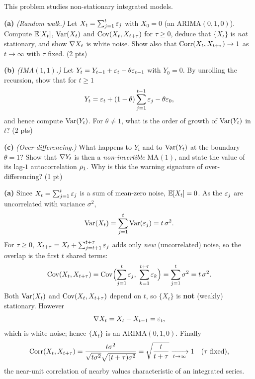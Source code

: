 \documentclass[11pt]{article}
\begin{document}
\statementstart
This problem studies non-stationary integrated models.

\textbf{(a)} \emph{(Random walk.)} Let $X_t=\sum_{j=1}^{t}\varepsilon_j$ with $X_0=0$ (an $\mathrm{ARIMA}(0,1,0)$). Compute $\mathbb{E}[X_t]$, $\operatorname{Var}(X_t)$ and $\operatorname{Cov}(X_t,X_{t+\tau})$ for $\tau\ge0$, deduce that $\{X_t\}$ is \emph{not} stationary, and show $\nabla X_t$ is white noise. Show also that $\operatorname{Corr}(X_t,X_{t+\tau})\to1$ as $t\to\infty$ with $\tau$ fixed. \hfill(2 pts)

\textbf{(b)} \emph{(IMA$(1,1)$.)} Let $Y_t=Y_{t-1}+\varepsilon_t-\theta\varepsilon_{t-1}$ with $Y_0=0$. By unrolling the recursion, show that for $t\ge1$
\[
Y_t=\varepsilon_t+(1-\theta)\sum_{j=1}^{t-1}\varepsilon_j-\theta\varepsilon_0 ,
\]
and hence compute $\operatorname{Var}(Y_t)$. For $\theta\neq1$, what is the order of growth of $\operatorname{Var}(Y_t)$ in $t$? \hfill(2 pts)

\textbf{(c)} \emph{(Over-differencing.)} What happens to $Y_t$ and to $\operatorname{Var}(Y_t)$ at the boundary $\theta=1$? Show that $\nabla Y_t$ is then a \emph{non-invertible} $\mathrm{MA}(1)$, and state the value of its lag-$1$ autocorrelation $\rho_1$. Why is this the warning signature of over-differencing? \hfill(1 pt)
\statementend

\textbf{(a)} Since $X_t=\sum_{j=1}^{t}\varepsilon_j$ is a sum of mean-zero noise, $\mathbb{E}[X_t]=0$. As the $\varepsilon_j$ are uncorrelated with variance $\sigma^{2}$,
\[
\operatorname{Var}(X_t)=\sum_{j=1}^{t}\operatorname{Var}(\varepsilon_j)=t\,\sigma^{2}.
\]
For $\tau\ge0$, $X_{t+\tau}=X_t+\sum_{j=t+1}^{t+\tau}\varepsilon_j$ adds only \emph{new} (uncorrelated) noise, so the overlap is the first $t$ shared terms:
\[
\Cov(X_t,X_{t+\tau})=\Cov\Bigl(\sum_{j=1}^{t}\eps_j,\ \sum_{k=1}^{t+\tau}\eps_k\Bigr)
=\sum_{j=1}^{t}\sigma^{2}=t\,\sigma^{2}.
\]
Both $\operatorname{Var}(X_t)$ and $\operatorname{Cov}(X_t,X_{t+\tau})$ depend on $t$, so $\{X_t\}$ is \textbf{not} (weakly) stationary. However
\[
\nabla X_t=X_t-X_{t-1}=\varepsilon_t ,
\]
which is white noise; hence $\{X_t\}$ is an $\mathrm{ARIMA}(0,1,0)$. Finally
\[
\operatorname{Corr}(X_t,X_{t+\tau})=\frac{t\sigma^{2}}{\sqrt{t\sigma^{2}}\sqrt{(t+\tau)\sigma^{2}}}
=\sqrt{\frac{t}{t+\tau}}\xrightarrow[t\to\infty]{}1 \quad(\tau\text{ fixed}),
\]
the near-unit correlation of nearby values characteristic of an integrated series.
\end{document}
